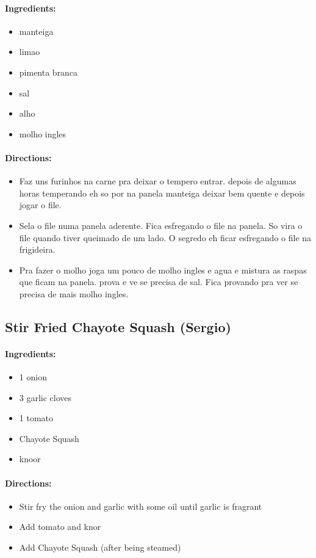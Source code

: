 \documentclass{article}
\begin{document}
\paragraph{Ingredients:}

\begin{itemize}
	\item manteiga
	\item limao
	\item pimenta branca
	\item sal
	\item alho
	\item molho ingles
\end{itemize}

\paragraph{Directions:}
\begin{itemize}
	\item Faz uns furinhos na carne pra deixar o tempero entrar. depois de algumas horas temperando eh so por na panela manteiga deixar bem quente e depois jogar o file.
	\item Sela o file numa panela aderente. Fica esfregando o file na panela. So vira o file quando tiver queimado de um lado. O segredo eh ficar esfregando o file na frigideira.
	\item Pra fazer o molho joga um pouco de molho ingles e agua e mistura as raspas que ficam na panela. prova e ve se precisa de sal. Fica provando pra ver se precisa de mais molho ingles.
\end{itemize}

\subsection{Stir Fried Chayote Squash (Sergio)}

\paragraph{Ingredients:}

\begin{itemize}
	\item 1 onion
	\item 3 garlic cloves
	\item 1 tomato
	\item Chayote Squash
	\item knoor 
\end{itemize}

\paragraph{Directions:}
\begin{itemize}
	\item Stir fry the onion and garlic with some oil until garlic is fragrant
	\item Add tomato and knor
	\item Add Chayote Squash (after being steamed)
\end{itemize}
\end{document}
